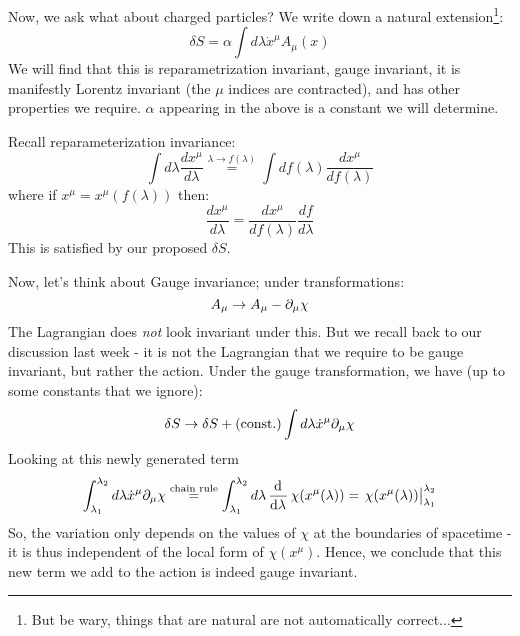 Now, we ask what about charged particles? We write down a natural extension\footnote{But be wary, things that are natural are not automatically correct...}:
\begin{equation}
    \delta S = \alpha\int d\lambda \dot{x}^\mu A_\mu(x)
\end{equation}
We will find that this is reparametrization invariant, gauge invariant, it is manifestly Lorentz invariant (the $\mu$ indices are contracted), and has other properties we require. $\alpha$ appearing in the above is a constant we will determine.

Recall reparameterization invariance:
\begin{equation}
    \int d\lambda \frac{dx^\mu}{d\lambda} \stackrel{\lambda\to f(\lambda)}{=} \int df(\lambda)\frac{dx^\mu}{df(\lambda)}
\end{equation}
where if $x^\mu = x^\mu(f(\lambda))$ then:
\begin{equation}
    \frac{dx^\mu}{d\lambda} = \frac{dx^\mu}{df(\lambda)}\frac{df}{d\lambda}
\end{equation}
This is satisfied by our proposed $\delta S$.

Now, let's think about Gauge invariance; under transformations:
\begin{equation}
    A_\mu \to A_\mu - \partial_\mu \chi
\end{equation}
The Lagrangian does \emph{not} look invariant under this. But we recall back to our discussion last week - it is not the Lagrangian that we require to be gauge invariant, but rather the action. Under the gauge transformation, we have (up to some constants that we ignore):
\begin{equation}
    \delta S \to \delta S + (\text{const.})\int d\lambda \dot{x}^\mu \partial_\mu \chi
\end{equation}
Looking at this newly generated term
\begin{equation}
    \int_{\lambda_1}^{\lambda_2} d\lambda \dot{x}^\mu \p_\mu \chi \stackrel{\text{chain rule}}{=} \int_{\lambda_1}^{\lambda_2} d\lambda \dod{}{\lambda}\chi(x^\mu(\lambda)) = \left.\chi(x^\mu(\lambda))\right|_{\lambda_1}^{\lambda_2}
\end{equation}
So, the variation only depends on the values of $\chi$ at the boundaries of spacetime - it is thus independent of the local form of $\chi(x^\mu)$. Hence, we conclude that this new term we add to the action is indeed gauge invariant.

